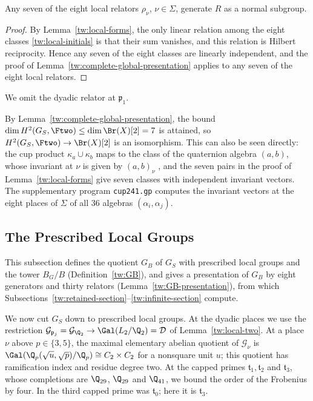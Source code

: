 \begin{corollary}\label{tw:any-seven}
Any seven of the eight local relators $\rho_\nu$, $\nu\in\Sigma$, generate
$R$ as a normal subgroup.
\end{corollary}

\begin{proof}
By Lemma~\ref{tw:local-forms}, the only linear relation among the eight
classes \eqref{tw:local-initials} is that their sum vanishes, and this
relation is Hilbert reciprocity. Hence any seven of the eight classes are
linearly independent, and the proof of
Lemma~\ref{tw:complete-global-presentation} applies to any seven of the eight
local relators.
\end{proof}

We omit the dyadic relator at $\mathfrak p_1$.

\begin{remark}\label{tw:cup-remark}
By Lemma~\ref{tw:complete-global-presentation}, the bound
$\dim H^2(G_S,\Ftwo)\le\dim\Br(X)[2]=7$ is attained, so
$H^2(G_S,\Ftwo)\to\Br(X)[2]$ is an isomorphism. This can also be seen
directly: the cup product
$\kappa_a\cup\kappa_b$ maps to the class of the quaternion algebra $(a,b)$, whose
invariant at $\nu$ is given by $(a,b)_\nu$ \cite[Chapter~III,
Remark~4.7]{MilneCFT}, and the seven pairs in the proof of
Lemma~\ref{tw:local-forms} give seven classes with independent invariant
vectors. The supplementary program \texttt{cup241.gp} computes the invariant
vectors at the eight places of $\Sigma$ of all $36$ algebras
$(\alpha_i,\alpha_j)$.
\end{remark}

\subsection{The Prescribed Local Groups}\label{tw:prescribed-section}
This subsection defines the quotient $G_B$ of $G_S$ with prescribed local
groups and the tower $B_G/B$ (Definition~\ref{tw:GB}), and gives a
presentation of $G_B$ by eight generators and thirty relators
(Lemma~\ref{tw:GB-presentation}), from which
Subsections~\ref{tw:retained-section}--\ref{tw:infinite-section} compute.

We now cut $G_S$ down to prescribed local groups. At the dyadic
places we use the restriction
$\mathcal G_{\mathfrak p_j}=\mathcal G_{\Q_2}\to\Gal(L_2/\Q_2)=\mathcal D$ of
Lemma~\ref{tw:local-two}. At a place $\nu$ above $p\in\{3,5\}$, the maximal
elementary abelian quotient of $\mathcal G_\nu$ is
$\Gal(\Q_p(\sqrt u,\sqrt p)/\Q_p)\cong C_2\times C_2$ for a nonsquare unit $u$;
this quotient has ramification index and residue degree two. At
the capped primes $\mathfrak t_1,\mathfrak t_2$ and $\mathfrak t_3$, whose
completions are $\Q_{29}$, $\Q_{29}$ and $\Q_{41}$, we bound the order of the
Frobenius by four. In \cite{Naslund04273} the third capped prime was
$\mathfrak t_0$; here it is $\mathfrak t_3$.

